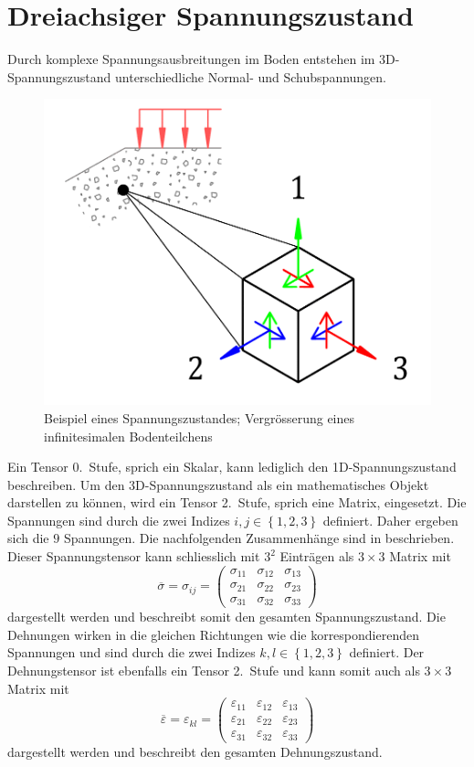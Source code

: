 \section{Dreiachsiger Spannungszustand\label{spannung:section:Dreiachsiger_Spannungszustand}}
Durch komplexe Spannungsausbreitungen im Boden entstehen im 3D-Spannungszustand unterschiedliche Normal- und Schubspannungen.
\begin{figure}
	\centering
	\includegraphics[width=0.30\linewidth,keepaspectratio]{papers/spannung/Grafiken/infinitesimalerWuerfel.png}
	\caption{Beispiel eines Spannungszustandes; Vergrösserung eines infinitesimalen Bodenteilchens}
	\label{fig:infinitesimalerWuerfel}
\end{figure}
Ein Tensor 0.~Stufe, sprich ein Skalar, kann lediglich den 1D-Spannungszustand beschreiben.
Um den 3D-Spannungszustand als ein mathematisches Objekt darstellen zu können, wird ein Tensor 2.~Stufe, sprich eine Matrix, eingesetzt.
Die Spannungen sind durch die zwei Indizes
\(
i, j\in\left\{1, 2, 3\right\}
\)
definiert.
Daher ergeben sich die $9$ Spannungen.
Die nachfolgenden Zusammenhänge sind in \cite{spannung:Voigtsche-Notation} beschrieben.
Dieser Spannungstensor kann schliesslich mit $3^2$ Einträgen als $3\times3$ Matrix mit
\[
\overline{\sigma}
=
\sigma_{i\!j}
=
\begin{pmatrix}
	\sigma_{11} & \sigma_{12} & \sigma_{13} \\ 
	\sigma_{21} & \sigma_{22} & \sigma_{23} \\
	\sigma_{31} & \sigma_{32} & \sigma_{33}
\end{pmatrix}
\]
dargestellt werden und beschreibt somit den gesamten Spannungszustand.
Die Dehnungen wirken in die gleichen Richtungen wie die korrespondierenden Spannungen und sind durch die zwei Indizes
\(
k, l\in\left\{1, 2, 3\right\}
\)
definiert.
Der Dehnungstensor ist ebenfalls ein Tensor 2.~Stufe und kann somit auch als $3\times3$ Matrix mit
\[
\overline{\varepsilon}
=
\varepsilon_{kl}
=
\begin{pmatrix}
	\varepsilon_{11} & \varepsilon_{12} & \varepsilon_{13} \\ 
	\varepsilon_{21} & \varepsilon_{22} & \varepsilon_{23} \\
	\varepsilon_{31} & \varepsilon_{32} & \varepsilon_{33}
\end{pmatrix}
\]
dargestellt werden und beschreibt den gesamten Dehnungszustand.

